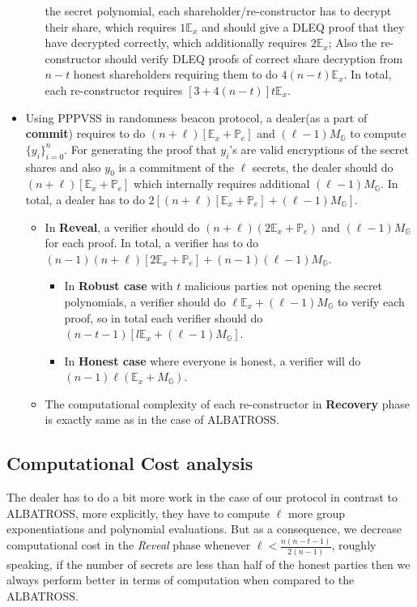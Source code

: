 \begin{itemize}
\begin{itemize}
            the secret polynomial, each shareholder/re-constructor has to 
            decrypt their share, which requires $1\mathbb{E}_{x}$ and should 
            give a DLEQ proof that they have decrypted correctly, which 
            additionally requires $2\mathbb{E}_x$; Also the re-constructor 
            should verify DLEQ proofs of correct share decryption from $n-t$ 
            honest shareholders requiring them to do $4(n-t)\mathbb{E}_{x}$. 
            In total, each re-constructor requires $[3+4(n-t)]t\mathbb{E}_{x}$.
        \end{itemize}
    \item Using PPPVSS in randomness beacon protocol, a dealer(as a part of \textbf{commit}) requires to do $(n+\ell)[\mathbb{E}_x+\mathbb{P}_e]$ and $(\ell-1)M_\mathbb{G}$ to compute $\{y_i\}_{i=0}^{n}$. For generating the proof that $y_i$'s are valid encryptions of the secret shares and also $y_0$ is a commitment of the $\ell$ secrets, the dealer should do $(n+\ell)[\mathbb{E}_x+\mathbb{P}_e]$ which internally requires additional $(\ell-1)M_\mathbb{G}$. In total, a dealer has to do $2\left[(n+\ell)[\mathbb{E}_x+\mathbb{P}_e]+(\ell-1)M_\mathbb{G}\right]$.
    \begin{itemize}
        \item In \textbf{Reveal}, a verifier should do $(n+\ell)(2\mathbb{E}_x+\mathbb{P}_e)$ and $(\ell-1)M_\mathbb{G}$ for each proof. In total, a verifier has to do $(n-1)(n+\ell)[2\mathbb{E}_x+\mathbb{P}_e]+(n-1)(\ell-1)M_\mathbb{G}$.
        \begin{itemize}
            \item In \textbf{Robust case} with $t$ malicious parties not opening the secret polynomials, a verifier should do $\ell\mathbb{E}_x+(\ell-1)M_\mathbb{G}$ to verify each proof, so in total each verifier should do $(n-t-1)[l\mathbb{E}_x+(\ell-1)M_\mathbb{G}]$.
            \item In \textbf{Honest case} where everyone is honest, a verifier will do $(n-1)\ell(\mathbb{E}_x+M_\mathbb{G})$.
        \end{itemize}
        \item The computational complexity of each re-constructor in \textbf{Recovery} phase is exactly same as in the case of ALBATROSS.
    \end{itemize}
\end{itemize}

\subsection{Computational Cost analysis}
The dealer has to do a bit more work in the case of our protocol in contrast to ALBATROSS, more explicitly, 
they have to compute $\ell$ more group exponentiations and polynomial evaluations. But as a consequence, 
we decrease computational cost in the \textit{Reveal} phase whenever $\ell < \frac{n(n-t-1)}{2(n-1)}$, roughly 
speaking, if the number of secrets are less than half of the honest parties then we always perform better in 
terms of computation when compared to the ALBATROSS.\par

